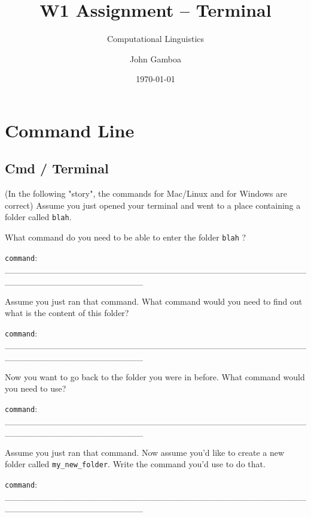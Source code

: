 \documentclass[a4paper,11pt]{scrartcl}
\title{W1 Assignment -- Terminal}
\subtitle{Computational Linguistics}
\author{John Gamboa}
\date{\today}
\begin{document}
\maketitle

\section{Command Line}

\subsection{Cmd / Terminal}

(In the following "story", the commands for Mac/Linux and for Windows are
correct)
Assume you just opened your terminal and went to a place containing a folder
called \verb|blah|.

What command do you need to be able to enter the folder \verb|blah| ?

\verb|command|: \_\_\_\_\_\_\_\_\_\_\_\_\_\_\_\_\_\_\_\_\_\_\_\_\_\_\_\_\_\_\_\_\_\_\_\_\_\_\_\_\_\_\_\_\_\_\_\_\_\_\_\_\_\_\_\_\_\_\_\_\_\_\_\_\_\_\_\_\_\_

Assume you just ran that command. What command would you need to find out what
is the content of this folder?

\verb|command|: \_\_\_\_\_\_\_\_\_\_\_\_\_\_\_\_\_\_\_\_\_\_\_\_\_\_\_\_\_\_\_\_\_\_\_\_\_\_\_\_\_\_\_\_\_\_\_\_\_\_\_\_\_\_\_\_\_\_\_\_\_\_\_\_\_\_\_\_\_\_

Now you want to go back to the folder you were in before. What command would you
need to use?

\verb|command|: \_\_\_\_\_\_\_\_\_\_\_\_\_\_\_\_\_\_\_\_\_\_\_\_\_\_\_\_\_\_\_\_\_\_\_\_\_\_\_\_\_\_\_\_\_\_\_\_\_\_\_\_\_\_\_\_\_\_\_\_\_\_\_\_\_\_\_\_\_\_

Assume you just ran that command. Now assume you'd like to create a new folder
called \verb|my_new_folder|. Write the command you'd use to do that.

\verb|command|: \_\_\_\_\_\_\_\_\_\_\_\_\_\_\_\_\_\_\_\_\_\_\_\_\_\_\_\_\_\_\_\_\_\_\_\_\_\_\_\_\_\_\_\_\_\_\_\_\_\_\_\_\_\_\_\_\_\_\_\_\_\_\_\_\_\_\_\_\_\_
\end{document}
